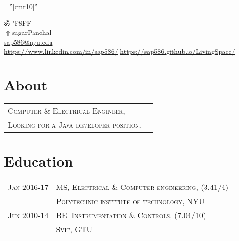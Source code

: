 \documentclass[a4paper]{article}
\newcommand{\apple}{\char"F8FF}
\begin{document}
\pagestyle{empty} 						%
\font\fb=''[cmr10]'' 						%

\par	{\centering
	ॐ
	{\setmainfont{Apple Chancery} \apple}																														\\
	\href{https://sap586.github.io/LivingSpace/}{$ \Uparrow$}{sagarPanchal}																										\\
	\small \href{mailto:sap586@nyu.edu}{sap586@nyu.edu}																						\\
	\small \href{https://www.linkedin.com/in/sap586/}{https://www.linkedin.com/in/sap586/}		\textbullet \href{https://sap586.github.io/LivingSpace/}{https://sap586.github.io/LivingSpace/}		\par}
	
\section	{	About		}
	\begin{tabular}{ll}
		\textsc{	Computer \& Electrical Engineer,					}\\
		\textsc{	Looking for a Java developer position.	}
	\\\end{tabular}



\section	{	Education		}
	\begin{tabular}{rl}
		\small{}\textsc{		Jan 2016-17	} 		& 		\textsc{	MS, Electrical \& Computer engineering, 		\small {(3.41/4)}			}	\\
 											& 		\textsc{	Polytechnic institute of technology, NYU							}	\\
 		\small{}\textsc{		Jun 2010-14	} 		& 		\textsc{	BE, Instrumentation \small{\&} Controls,		\small {(7.04/10)}		}	\\
 											& 		\textsc{	Svit, GTU													}	\\
	\end{tabular}

\end{document}

